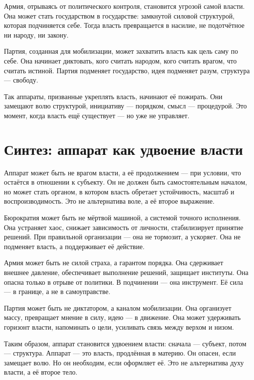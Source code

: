 Армия, отрываясь от политического контроля, становится угрозой самой власти. Она может стать государством в государстве: замкнутой силовой структурой, которая подчиняется себе. Тогда власть превращается в насилие, не подотчётное ни народу, ни закону.

Партия, созданная для мобилизации, может захватить власть как цель саму по себе. Она начинает диктовать, кого считать народом, кого считать врагом, что считать истиной. Партия подменяет государство, идея подменяет разум, структура — свободу.

Так аппараты, призванные укреплять власть, начинают её пожирать. Они замещают волю структурой, инициативу — порядком, смысл — процедурой. Это момент, когда власть ещё существует — но уже не управляет.

\section{Синтез: аппарат как удвоение власти}

Аппарат может быть не врагом власти, а её продолжением — при условии, что остаётся в отношении к субъекту. Он не должен быть самостоятельным началом, но может стать органом, в котором власть обретает устойчивость, масштаб и воспроизводимость. Это не альтернатива воле, а её второе выражение.

Бюрократия может быть не мёртвой машиной, а системой точного исполнения. Она устраняет хаос, снижает зависимость от личности, стабилизирует принятие решений. При правильной организации — она не тормозит, а ускоряет. Она не подменяет власть, а поддерживает её действие.

Армия может быть не силой страха, а гарантом порядка. Она сдерживает внешнее давление, обеспечивает выполнение решений, защищает институты. Она опасна только в отрыве от политики. В подчинении — она инструмент. Её сила — в границе, а не в самоуправстве.

Партия может быть не диктатором, а каналом мобилизации. Она организует массу, превращает мнение в силу, идею — в движение. Она может удерживать горизонт власти, напоминать о цели, усиливать связь между верхом и низом.

Таким образом, аппарат становится удвоением власти: сначала — субъект, потом — структура. Аппарат — это власть, продлённая в материю. Он опасен, если замещает волю. Но он необходим, если оформляет её. Это не альтернатива духу власти, а её второе тело.
